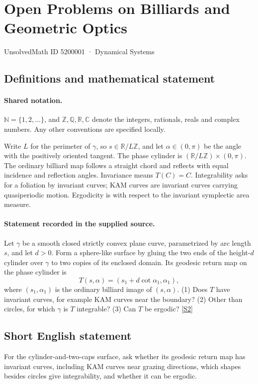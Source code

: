 \documentclass[11pt]{article}
\newcommand{\sref}[2]{\hyperlink{source:#1:#2}{[S#2]}}
\begin{document}
\setcounter{section}{5200000}
\section{Open Problems on Billiards and Geometric Optics}\label{5200001}
{\small\sffamily UnsolvedMath ID 5200001 · Dynamical Systems}
\subsection{Definitions and mathematical statement}

\paragraph{Shared notation.}$\mathbb N=\{1,2,\ldots\}$, and $\mathbb Z,\mathbb Q,\mathbb R,\mathbb C$ denote the integers, rationals, reals and complex numbers. Any other conventions are specified locally.


Write $L$ for the perimeter of $\gamma$, so $s\in\mathbb R/L\mathbb Z$, and let $\alpha\in(0,\pi)$ be the angle with the positively oriented tangent. The phase cylinder is $(\mathbb R/L\mathbb Z)\times(0,\pi)$. The ordinary billiard map follows a straight chord and reflects with equal incidence and reflection angles. Invariance means $T(C)=C$. Integrability asks for a foliation by invariant curves; KAM curves are invariant curves carrying quasiperiodic motion. Ergodicity is with respect to the invariant symplectic area measure.
\paragraph{Statement recorded in the supplied source.}
Let $\gamma$ be a smooth closed strictly convex plane curve, parametrized by arc length $s$, and let $d>0$. Form a sphere-like surface by gluing the two ends of the height-$d$ cylinder over $\gamma$ to two copies of its enclosed domain. Its geodesic return map on the phase cylinder is $$T(s,\alpha)=(s_1+d\cot\alpha_1,\alpha_1),$$ where $(s_1,\alpha_1)$ is the ordinary billiard image of $(s,\alpha)$. (1) Does $T$ have invariant curves, for example KAM curves near the boundary? (2) Other than circles, for which $\gamma$ is $T$ integrable? (3) Can $T$ be ergodic? \sref{5200001}{2}
\subsection{Short English statement}
For the cylinder-and-two-caps surface, ask whether its geodesic return map has invariant curves, including KAM curves near grazing directions, which shapes besides circles give integrability, and whether it can be ergodic.
\end{document}

